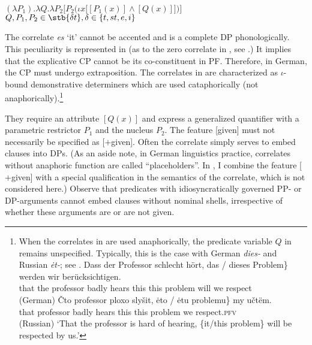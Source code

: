 \documentclass[output=paper,
colorlinks,
citecolor=brown,
newtxmath
]{langscibook}
\begin{document}
    \ex\label{ex:15c}
    $(\lambda P_1) . \lambda Q . \lambda P_2 \Big[P_2\big(\iota x \big[[P_1 (x)] \wedge [Q (x)]\big]\big)\Big]$\\
    {\small $Q, P_1, P_2 \in \stb{\delta t}, {\delta} \in \{t, st, e, i\}$}
\z\z

\noindent The correlate \textit{es} `it' cannot be accented and is a complete DP phonologically. This peculiarity is represented in  (as to the zero correlate in , see .) It implies that the explicative CP cannot be its co-constituent in PF. Therefore, in German, the CP must undergo extraposition. The correlates in  are characterized as $\iota$-bound demonstrative determiners which are used cataphorically (not anaphorically).\footnote{When the correlates in  are used anaphorically, the predicate variable $Q$ in  remains unspecified. Typically, this is the case with German \textit{dies-} and Russian \textit{ėt-}; see .
        \ea\label{ex:fn20}
            \ea \gll Dass der Professor schlecht hört, \minsp{\{} das / dieses Problem\} werden wir berücksichtigen. \\
            that the professor badly hears {} this {} this problem will we respect\\ \hfill (German)
            \ex \gll Čto professor ploxo slyšit, \minsp{\{} ėto / ėtu problemu\} my učtëm.\\
            that professor badly hears {} this {} this problem we respect.\textsc{pfv}\\ \hfill (Russian)
            \z
            \glt `That the professor is hard of hearing, \{it/this problem\} will be respected by us.'
        \z}

They require an attribute $[Q (x)]$ and express a generalized quantifier with a parametric restrictor $P_1$ and the nucleus $P_2$. The feature [given] must not necessarily be specified as [$+$given]. Often the correlate simply serves to embed clauses into DPs. (As an aside note, in German linguistics practice, correlates without anaphoric function are called ``placeholders''. In \citet{Zimmermann2019c}, I combine the feature [$+$given] with a special qualification in the semantics of the correlate, which is not considered here.) Observe that predicates with idiosyncratically governed PP- or DP-arguments cannot embed clauses without nominal shells, irrespective of whether these arguments are or are not given.
\end{document}
